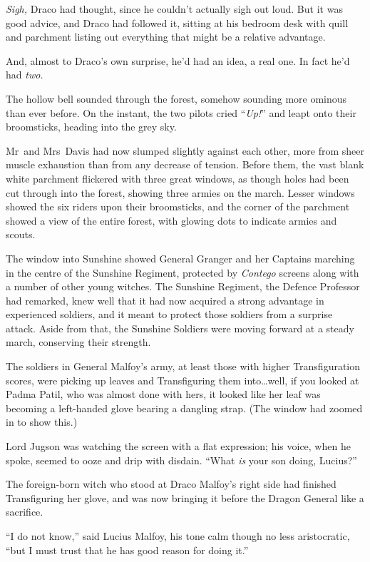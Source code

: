 \emph{Sigh,} Draco had thought, since he couldn’t actually sigh out loud. But it was good advice, and Draco had followed it, sitting at his bedroom desk with quill and parchment listing out everything that might be a relative advantage.

And, almost to Draco’s own surprise, he’d had an idea, a real one. In fact he’d had \emph{two.}

The hollow bell sounded through the forest, somehow sounding more ominous than ever before. On the instant, the two pilots cried “\emph{Up!}” and leapt onto their broomsticks, heading into the grey sky.

\later

Mr~and Mrs~Davis had now slumped slightly against each other, more from sheer muscle exhaustion than from any decrease of tension. Before them, the vast blank white parchment flickered with three great windows, as though holes had been cut through into the forest, showing three armies on the march. Lesser windows showed the six riders upon their broomsticks, and the corner of the parchment showed a view of the entire forest, with glowing dots to indicate armies and scouts.

The window into Sunshine showed General Granger and her Captains marching in the centre of the Sunshine Regiment, protected by \emph{Contego} screens along with a number of other young witches. The Sunshine Regiment, the Defence Professor had remarked, knew well that it had now acquired a strong advantage in experienced soldiers, and it meant to protect those soldiers from a surprise attack. Aside from that, the Sunshine Soldiers were moving forward at a steady march, conserving their strength.

The soldiers in General Malfoy’s army, at least those with higher Transfiguration scores, were picking up leaves and Transfiguring them into…well, if you looked at Padma Patil, who was almost done with hers, it looked like her leaf was becoming a left-handed glove bearing a dangling strap. (The window had zoomed in to show this.)

Lord Jugson was watching the screen with a flat expression; his voice, when he spoke, seemed to ooze and drip with disdain. “What \emph{is} your son doing, Lucius?”

The foreign-born witch who stood at Draco Malfoy’s right side had finished Transfiguring her glove, and was now bringing it before the Dragon General like a sacrifice.

“I do not know,” said Lucius Malfoy, his tone calm though no less aristocratic, “but I must trust that he has good reason for doing it.”

